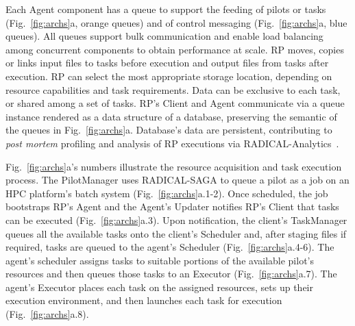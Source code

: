 \documentclass[preprint,12pt, a4paper]{elsarticle}
\begin{document}
Each Agent component has a queue to support the feeding of pilots or tasks
(Fig.~\ref{fig:archs}a, orange queues) and of control messaging
(Fig.~\ref{fig:archs}a, blue queues). All queues support bulk communication
and enable load balancing among concurrent components to obtain performance
at scale.
%
%
RP moves, copies or links input files to tasks before execution and output files
from tasks after execution. RP can select the most appropriate storage location,
depending on resource capabilities and task requirements. Data can be exclusive
to each task, or shared among a set of tasks.
%
%
RP's Client and Agent communicate via a queue instance rendered as a data
structure of a database, preserving the semantic of the queues in
Fig.~\ref{fig:archs}a. Database's data are persistent, contributing to
\textit{post mortem} profiling and analysis of RP executions via
RADICAL-Analytics~\cite{radical-analytics}.

Fig.~\ref{fig:archs}a's numbers illustrate the resource acquisition and task
execution process. The PilotManager uses RADICAL-SAGA to queue a pilot as a job
on an HPC platform's batch system (Fig.~\ref{fig:archs}a.1-2). Once scheduled,
the job bootstraps RP's Agent and the Agent's Updater notifies RP's Client that
tasks can be executed (Fig.~\ref{fig:archs}a.3). Upon notification, the client's
TaskManager queues all the available tasks onto the client's Scheduler and,
after staging files if required, tasks are queued to the agent's Scheduler
(Fig.~\ref{fig:archs}a.4-6). The agent's scheduler assigns tasks to suitable
portions of the available pilot's resources and then queues those tasks to an
Executor (Fig.~\ref{fig:archs}a.7). The agent's Executor places each task on the
assigned resources, sets up their execution environment, and then launches each
task for execution (Fig.~\ref{fig:archs}a.8).
\end{document}
